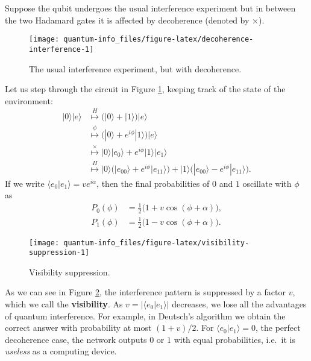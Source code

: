 \documentclass{article}
\begin{document}
Suppose the qubit undergoes the usual interference experiment but in between the two Hadamard gates it is affected by decoherence (denoted by \(\times\)).

\begin{figure}[H]

{\centering \texttt{[image: quantum-info\_files/figure-latex/decoherence-interference-1]} 

}

\caption{The usual interference experiment, but with decoherence.}\label{fig:decoherence-interference}
\end{figure}

Let us step through the circuit in Figure \ref{fig:decoherence-interference}, keeping track of the state of the environment:
\[
  \begin{aligned}
    |0\rangle|e\rangle
    & \overset{H}{\longmapsto} \Big( |0\rangle + |1\rangle \Big) |e\rangle
  \\& \overset{\phi}{\longmapsto} \Big( |0\rangle + e^{i\phi}|1\rangle \Big) |e\rangle
  \\& \overset{\times}{\longmapsto} |0\rangle|e_0\rangle + e^{i\phi}|1\rangle|e_1\rangle
  \\& \overset{H}{\longmapsto} |0\rangle\Big( |e_{00}\rangle + e^{i\phi}|e_{11}\rangle \Big) + |1\rangle\Big( |e_{00}\rangle - e^{i\phi}|e_{11}\rangle \Big).
  \end{aligned}
\]
If we write \(\langle e_0|e_1\rangle = ve^{i\alpha}\), then the final probabilities of \(0\) and \(1\) oscillate with \(\phi\) as
\[
  \begin{aligned}
    P_{0}(\phi) &= \frac12\big(1 + v\cos(\phi + \alpha)\big),
  \\P_{1}(\phi) &= \frac12\big(1 - v\cos(\phi + \alpha)\big).
  \end{aligned}
\]

\begin{figure}[H]

{\centering \texttt{[image: quantum-info\_files/figure-latex/visibility-suppression-1]} 

}

\caption{Visibility suppression.}\label{fig:visibility-suppression}
\end{figure}

As we can see in Figure \ref{fig:visibility-suppression}, the interference pattern is suppressed by a factor \(v\), which we call the \textbf{visibility}.
As \(v=|\!\langle e_0|e_1\rangle\!|\) decreases, we lose all the advantages of quantum interference.
For example, in Deutsch's algorithm we obtain the correct answer with probability at most \((1+v)/2\).
For \(\langle e_0|e_1\rangle = 0\), the perfect decoherence case, the network outputs \(0\) or \(1\) with equal probabilities, i.e.~it is \emph{useless} as a computing device.
\end{document}
